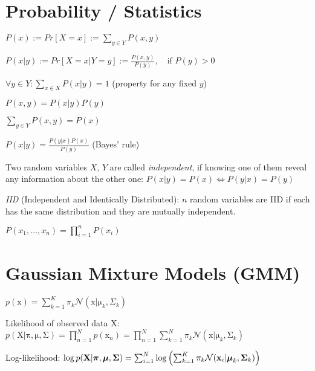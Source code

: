 \documentclass[a4paper, 11pt, landscape]{article}
\newcommand{\matr}[1]{\boldsymbol{\mathrm{#1}}}
\begin{document}
\begin{multicols*}{3}
\section{Probability / Statistics}
\begin{compactitem}
	\item $P(x) := Pr[X = x] := \sum_{y \in Y} P(x, y)$
	\item $P(x|y) := Pr[X = x | Y = y] := \frac{P(x,y)}{P(y)},\quad \text{if } P(y) > 0$
	\item $\forall y \in Y: \sum_{x \in X} P(x|y) = 1$ (property for any fixed $y$)
	\item $P(x, y) = P(x|y) P(y)$
	\item $\sum_{y \in Y} P(x, y) = P(x)$
	\item $P(x|y) = \frac{P(y|x)P(x)}{P(y)}$ (Bayes' rule)
	\item Two random variables $X$, $Y$ are called \emph{independent}, if knowing one of them reveal any information about the other one: $P(x|y) = P(x) \Leftrightarrow P(y|x) = P(y)$
	\item \emph{IID} (Independent and Identically Distributed): $n$ random variables are IID if each has the same distribution and they are mutually independent.
	\begin{compactitem}
		\item $P(x_1, \ldots, x_n) = \prod_{i=1}^n P(x_i)$
	\end{compactitem}
\end{compactitem}

\section{Gaussian Mixture Models (GMM)}
\begin{compactdesc}
	\item[] $p(\matr{x}) = \sum_{k=1}^K \pi_k \mathcal{N}(\matr{x} | \matr{\mu}_k, \Sigma_k)$
	\item[Likelihood of observed data $\matr{X}$:] $p(\matr{X} | \matr{\pi}, \matr{\mu}, \matr{\Sigma}) = \prod_{n=1}^N p(\matr{x}_n) = \prod_{n=1}^N \sum_{k=1}^N \pi_k \mathcal{N}(\matr{x} | \matr{\mu}_k, \matr{\Sigma}_k)$
	\item[Log-likelihood:] $\log p(\matr{X} | \matr{\pi}, \matr{\mu}, \matr{\Sigma}) =\break \sum_{i=1}^N \log \left( \sum_{k=1}^K \pi_k \mathcal{N}(\matr{x}_i | \matr{\mu}_k, \matr{\Sigma}_k) \right)$
\end{compactdesc}


\end{multicols*}
\end{document}
